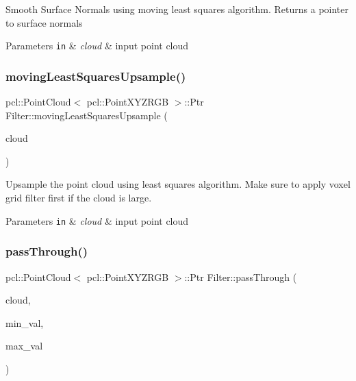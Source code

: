Smooth Surface Normals using moving least squares algorithm. Returns a pointer to surface normals 
\begin{DoxyParams}[1]{Parameters}
\mbox{\tt in}  & {\em cloud} & input point cloud \\
\hline
\end{DoxyParams}
\hypertarget{class_filter_aa0575e5df91c3b38156c19601c955ec6}{}\label{class_filter_aa0575e5df91c3b38156c19601c955ec6} 
\subsubsection{\texorpdfstring{moving\+Least\+Squares\+Upsample()}{movingLeastSquaresUpsample()}}
{\footnotesize\ttfamily pcl\+::\+Point\+Cloud$<$ pcl\+::\+Point\+X\+Y\+Z\+R\+GB $>$\+::Ptr Filter\+::moving\+Least\+Squares\+Upsample (\begin{DoxyParamCaption}\item[{const pcl\+::\+Point\+Cloud$<$ pcl\+::\+Point\+X\+Y\+Z\+R\+GB $>$\+::Ptr \&}]{cloud }\end{DoxyParamCaption})}

Upsample the point cloud using least squares algorithm. Make sure to apply voxel grid filter first if the cloud is large. 
\begin{DoxyParams}[1]{Parameters}
\mbox{\tt in}  & {\em cloud} & input point cloud \\
\hline
\end{DoxyParams}
\hypertarget{class_filter_a603911357de3e32f0c814c9a9689d406}{}\label{class_filter_a603911357de3e32f0c814c9a9689d406} 
\subsubsection{\texorpdfstring{pass\+Through()}{passThrough()}}
{\footnotesize\ttfamily pcl\+::\+Point\+Cloud$<$ pcl\+::\+Point\+X\+Y\+Z\+R\+GB $>$\+::Ptr Filter\+::pass\+Through (\begin{DoxyParamCaption}\item[{const pcl\+::\+Point\+Cloud$<$ pcl\+::\+Point\+X\+Y\+Z\+R\+GB $>$\+::Ptr \&}]{cloud,  }\item[{float}]{min\+\_\+val,  }\item[{float}]{max\+\_\+val }\end{DoxyParamCaption})}


